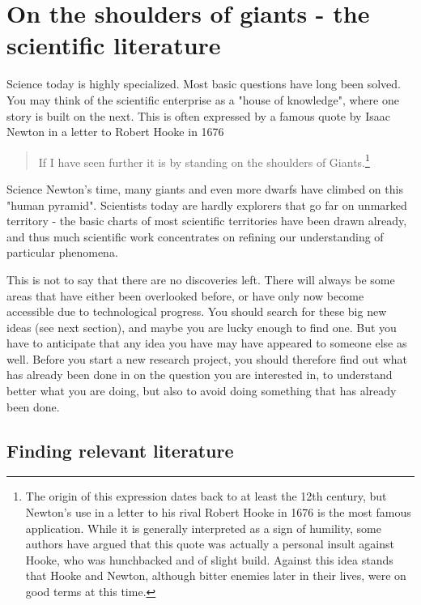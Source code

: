 \documentclass{tufte-book}
\begin{document}


\chapter{On the shoulders of giants - the scientific literature}

Science today is highly specialized. Most basic questions have long been solved. You may think of the scientific enterprise as a "house of knowledge", where one story is built on the next. This is often expressed by a famous quote by Isaac Newton in a letter to Robert Hooke in 1676

\begin{quote}
If I have seen further it is by standing on the shoulders of Giants.\footnote{The origin of this expression dates back to at least the 12th century, but Newton's use in a letter to his rival Robert Hooke in 1676 is the most famous application. While it is generally interpreted as a sign of humility, some authors have argued that this quote was actually a personal insult against Hooke, who was hunchbacked and of slight build. Against this idea stands that Hooke and Newton, although bitter enemies later in their lives, were on good terms at this time.}
\end{quote}

Science Newton's time, many giants and even more dwarfs have climbed on this "human pyramid". Scientists today are hardly explorers that go far on unmarked territory - the basic charts of most scientific territories have been drawn already, and thus much scientific work concentrates on refining our understanding of particular phenomena.

This is not to say that there are no discoveries left. There will always be some areas that have either been overlooked before, or have only now become accessible due to technological progress. You should search for these big new ideas (see next section), and maybe you are lucky enough to find one. But you have to anticipate that any idea you have may have appeared to someone else as well. Before you start a new research project, you should therefore find out what has already been done in on the question you are interested in, to understand better what you are doing, but also to avoid doing something that has already been done.


\section{Finding relevant literature}
\end{document}
